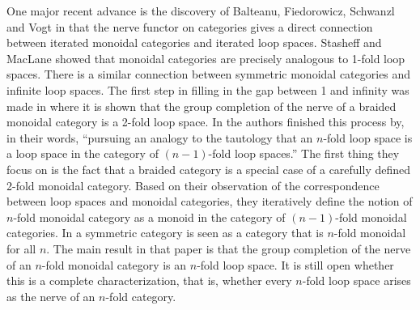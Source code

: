\documentclass{tac}
\begin{document}
{            One major recent advance is the discovery of Balteanu, Fiedorowicz, Schwanzl and Vogt in 
            \cite{Balt} that the nerve functor on categories gives 
            a direct connection between iterated monoidal categories and iterated loop spaces.
            Stasheff \cite{Sta} and
	        MacLane \cite{Mac} showed that monoidal categories are precisely analogous to 1-fold
	        loop spaces. There is a similar connection between symmetric monoidal categories and
	        infinite loop spaces. The first step in filling in the gap between 1 and infinity was made in
	        \cite{ZF} where it is shown that the group completion of the nerve of a braided monoidal category
	        is a 2-fold loop space.   
	        In \cite{Balt} the authors finished this process by, in their words, ``pursuing an analogy to the tautology 
	        that an $n$-fold loop space is a loop
	        space in the category of $(n-1)$-fold loop spaces.'' The first
	        thing they focus on is the fact that a braided category is a special case of a carefully
	        defined 2-fold monoidal category. Based on their observation of the  correspondence between
	        loop spaces and monoidal categories, they iteratively define the notion of $n$-fold
	        monoidal category as a monoid in the category of $(n-1)$-fold monoidal categories.
	        In \cite{Balt} a symmetric category
	        is seen as a category that is $n$-fold monoidal for all $n$.
	        The main result in that paper is that the group
    completion of the nerve of an $n$-fold monoidal category is an $n$-fold loop space.
            It is still
            open whether this is a complete characterization, that is, whether every $n$-fold loop space arises as the 
            nerve of an $n$-fold category. 
            
}
\end{document}
